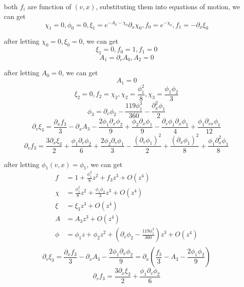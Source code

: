 \documentclass[12pt,a4paper]{ctexart}
\numberwithin{equation}{section}
\begin{document}
both $f_i$ are function of $(v,x)$, substituting them into equations of motion, we can get
\begin{equation}
    \chi_1=0,\phi_0=0,\xi_1=e^{-A_0-\chi_0}\partial_x\chi_0,f_0=e^{-\chi_0},f_1=-\partial_x\xi_0
\end{equation}

after letting $\chi_0=0,\xi_0=0$, we can get
\begin{equation}
    \xi_1=0,f_0=1,f_1=0
\end{equation}
\begin{equation}
    A_1=\partial_v A_0,A_2=0
\end{equation}

after letting $A_0=0$, we can get
\begin{equation}
    A_1=0
\end{equation}
\begin{equation}
    \xi_2=0,f_2=\chi_2,\chi_2=\frac{\phi_1^2}{8},\chi_3=\frac{\phi_1\phi_2}{3}
\end{equation}
\begin{equation}
    \phi_3=\partial_v\phi_2-\frac{119\phi_1^3}{360}-\frac{\partial_x^2\phi_1}{2}
\end{equation}
\begin{equation}
    \partial_v\xi_3=\frac{\partial_x f_3}{3}-\partial_x A_3-\frac{2\phi_1\partial_x\phi_2}{9}+\frac{\phi_2\partial_x\phi_1}{9}-\frac{\partial_v\phi_1\partial_x\phi_1}{4}+\frac{\phi_1\partial_{vx}\phi_1}{12}
\end{equation}
\begin{equation}
    \partial_v f_3=\frac{3\partial_x\xi_3}{2}+\frac{\phi_1\partial_v\phi_2}{6}+\frac{2\phi_2\partial_v\phi_1}{3}-\frac{(\partial_v\phi_1)^2}{2}+\frac{(\partial_x\phi_1)^2}{8}+\frac{\phi_1\partial_x^2\phi_1}{8}
\end{equation}

after letting $\phi_1(v,x)=\phi_1$, we can get
\begin{equation}
    \begin{aligned}
        f&=1+\frac{\phi_1^2}{8}z^2+f_3 z^3+O(z^4)\\
        \chi&=\frac{\phi_1^2}{8}z^2+\frac{\phi_1\phi_2}{3}z^3+O(z^4)\\
        \xi&=\xi_3 z^3+O(z^4)\\
        A&=A_3 z^3+O(z^4)\\
        \phi&=\phi_1 z+\phi_2 z^2+(\partial_v\phi_2-\frac{119\phi_1^3}{360})z^3+O(z^4)\\
    \end{aligned}
\end{equation}
\begin{equation}
    \partial_v\xi_3=\frac{\partial_x f_3}{3}-\partial_x A_3-\frac{2\phi_1\partial_x\phi_2}{9}=\partial_x(\frac{ f_3}{3}-A_3-\frac{2\phi_1\phi_2}{9})
\end{equation}
\begin{equation}
    \partial_v f_3=\frac{3\partial_x\xi_3}{2}+\frac{\phi_1\partial_v\phi_2}{6}
\end{equation}
\end{document}
